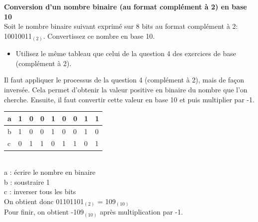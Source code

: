 \begin{Exercice}[5 minutes] \textbf{Conversion d'un nombre binaire (au format complément à 2) en base 10}\\
    
    Soit le nombre binaire suivant exprimé sur 8 bits au format complément à 2: 10010011$_{(2)}$. Convertissez ce nombre en base 10. \\
	
    \begin{conseil}
    
    \begin{itemize}
    	\item Utilisez le même tableau que celui de la question 4 des exercices de base (complément à 2).
    \end{itemize}
    
    \end{conseil}
    
    \begin{solution}
       Il faut appliquer le processus de la question 4 (complément à 2), mais de façon inversée. Cela permet d'obtenir la valeur positive en binaire du nombre que l'on cherche. Ensuite, il faut convertir cette valeur en base 10 et puis multiplier par -1. \\
       
       \begin{tabular}{| p{1cm} | p{1cm} | p{1cm} | p{1cm} | p{1cm} | p{1cm} | p{1cm} | p{1cm} | p{1cm} |} 
            \hline
            a & 1 & 0 & 0 & 1 & 0 & 0 & 1 & 1 \\ [0.5ex] 
            \hline
            b & 1 & 0 & 0 & 1 & 0 & 0 & 1 & 0 \\ [0.5ex]
            \hline
            c & 0 & 1 & 1 & 0 & 1 & 1 & 0 & 1 \\ [0.5ex]
            \hline
        \end{tabular} \\
        
        a : écrire le nombre en binaire \\
        
        b : soustraire 1 \\
        
        c : inverser tous les bits \\
        
        On obtient donc 01101101$_{(2)}$ = 109$_{(10)}$ \\
        
        Pour finir, on obtient -109$_{(10)}$ après multiplication par -1.
       
    \end{solution}
\end{Exercice}




